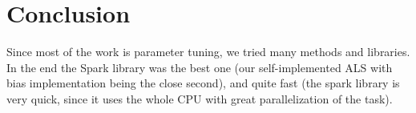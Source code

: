 \documentclass[a4paper]{article}
\begin{document}
\section{Conclusion}
Since most of the work is parameter tuning, we tried many methods and libraries. In the end the Spark library was the best one (our self-implemented ALS with bias implementation being the close second), and quite fast (the spark library is very quick, since it uses the whole CPU with great parallelization of the task). 
\end{document}
